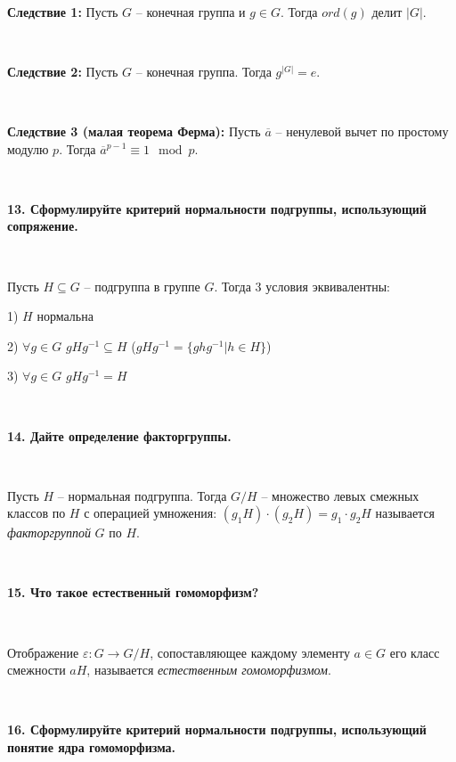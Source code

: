 \documentclass{article}
\begin{document}
	{
		$\;$
		\setlength{\parindent}{0.4cm}
		\hangindent=0.4cm
		
		\textbf{Следствие 1:} Пусть $G$ -- конечная группа и $g\in G$. Тогда $ord(g)$ делит $|G|$.
		
		$\;$
		
		\textbf{Следствие 2:} Пусть $G$ -- конечная группа. Тогда $g^{|G|}=e$.
		
		$\;$
		
		\textbf{Следствие 3 (малая теорема Ферма):}
		Пусть $\overline a $ -- ненулевой вычет по простому модулю $p$. Тогда $\overline{a}^{p-1}\equiv1\mod p$.
		
		$\;$
		\setlength{\parindent}{0cm}
		\hangindent=0cm
	}
	
	\textbf{13. Сформулируйте критерий нормальности подгруппы, использующий сопряжение.}
	
	{
		$\;$
		\setlength{\parindent}{0.4cm}
		\hangindent=0.4cm
		
		Пусть $H\subseteq G$ -- подгруппа в группе $G$. Тогда 3 условия эквивалентны:
		
		1) $H$ нормальна
		
		2) $\forall g\in G$ $gHg^{-1}\subseteq H$ ($gHg^{-1}=\{ghg^{-1}|h\in H \}$)
		
		3) $\forall g\in G$ $gHg^{-1}=H$
		
		$\;$
		\setlength{\parindent}{0cm}
		\hangindent=0cm
	}
	
	\textbf{14. Дайте определение факторгруппы.}
	
	{
		$\;$
		\setlength{\parindent}{0.4cm}
		\hangindent=0.4cm
		
		Пусть $H$ -- нормальная подгруппа. Тогда $G/ H$ -- множество левых смежных классов по $H$ с операцией умножения: $(g_1H)\cdot(g_2H)=g_1\cdot g_2H$ называется \textit{факторгруппой} $G$ по $H$.
		
		$\;$
		\setlength{\parindent}{0cm}
		\hangindent=0cm
	}
	
	\textbf{15. Что такое естественный гомоморфизм?}
	
	{
		$\;$
		\setlength{\parindent}{0.4cm}
		\hangindent=0.4cm
		
		Отображение $\varepsilon:G\rightarrow G/H$, сопоставляющее каждому элементу $a\in G$ его класс смежности $aH$, называется \textit{естественным гомоморфизмом}.
		
		$\;$
		\setlength{\parindent}{0cm}
		\hangindent=0cm
	}
	
	 \textbf{16. Сформулируйте критерий нормальности подгруппы, использующий понятие ядра гомоморфизма.}
	
\end{document}
